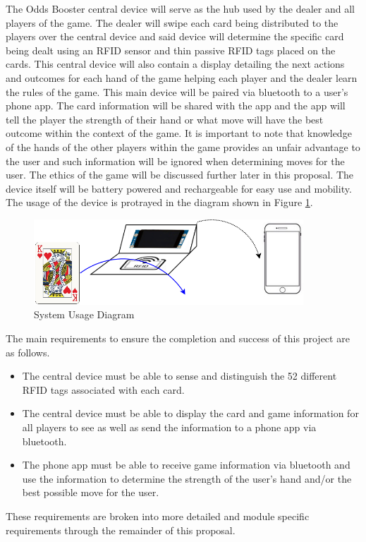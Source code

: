\documentclass[12pt]{article}
\begin{document}
The Odds Booster central device will serve as the hub used by the dealer and all players of the game. The dealer will swipe each card being distributed to the players over the central device and said device will determine the specific card being dealt using an RFID sensor and thin passive RFID tags placed on the cards. This central device will also contain a display detailing the next actions and outcomes for each hand of the game helping each player and the dealer learn the rules of the game. This main device will be paired via bluetooth to a user's phone app. The card information will be shared with the app and the app will tell the player the strength of their hand or what move will have the best outcome within the context of the game. It is important to note that knowledge of the hands of the other players within the game provides an unfair advantage to the user and such information will be ignored when determining moves for the user. The ethics of the game will be discussed further later in this proposal. The device itself will be battery powered and rechargeable for easy use and mobility. The usage of the device is protrayed in the diagram shown in Figure \ref{fig:use_dia}.

\begin{figure}[h!]
	\centering
	\includegraphics[width=0.9\textwidth]{ProposalUsageDiagram.png}
	\caption{System Usage Diagram}
	\label{fig:use_dia}
\end{figure}

\noindent
The main requirements to ensure the completion and success of this project are as follows.
\begin{itemize}
\item The central device must be able to sense and distinguish the 52 different RFID tags associated with each card.
\item The central device must be able to display the card and game information for all players to see as well as send the information to a phone app via bluetooth.
\item The phone app must be able to receive game information via bluetooth and use the information to determine the strength of the user's hand and/or the best possible move for the user.
\end{itemize}
These requirements are broken into more detailed and module specific requirements through the remainder of this proposal.
\end{document}
